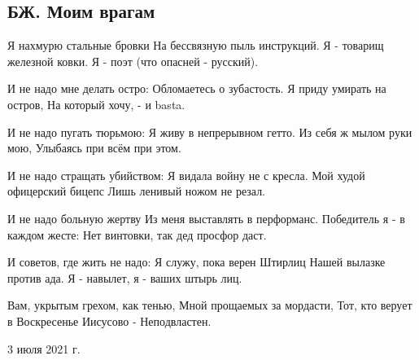  
 
 
 
 
\subsection{БЖ. Моим врагам}
\label{sec:03_07_2021.tg.bilchenko_evgenia.1.vragi}

Я нахмурю стальные бровки
На бессвязную пыль инструкций.
Я - товарищ железной ковки.
Я - поэт (что опасней - русский).

И не надо мне делать остро:
Обломаетесь о зубастость.
Я приду умирать на остров,
На который хочу, - и basta.

И не надо пугать тюрьмою:
Я живу в непрерывном гетто.
Из себя ж мылом руки мою,
Улыбаясь при всём при этом.

И не надо стращать убийством:
Я видала войну не с кресла.
Мой худой офицерский бицепс
Лишь ленивый ножом не резал.

И не надо больную жертву
Из меня выставлять в перформанс.
Победитель я - в каждом жесте:
Нет винтовки, так дед просфор даст.

И советов, где жить не надо:
Я служу, пока верен Штирлиц
Нашей вылазке против ада.
Я - навылет, я - ваших штырь лиц.

Вам, укрытым грехом, как тенью,
Мной прощаемых за мордасти,
Тот, кто верует в Воскресенье
Иисусово - 
Неподвластен.

3 июля 2021 г.
